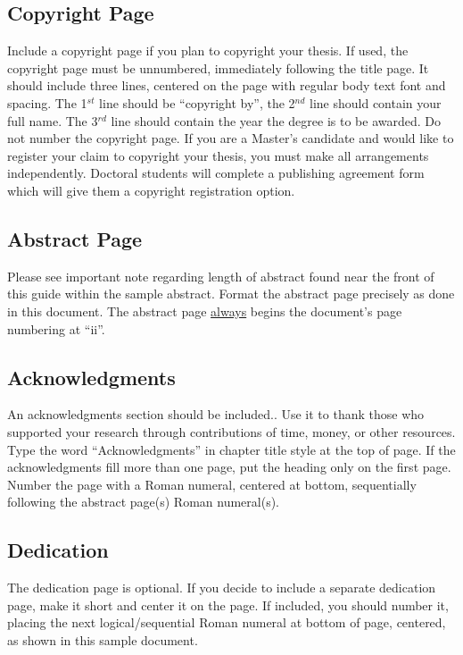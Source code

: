 \subsection{Copyright Page}

Include a copyright page if you plan to copyright your thesis.  If used, the
copyright page must be unnumbered, immediately following the title page.  It
should include three lines, centered on the page with regular body text font
and spacing.  The 1$^{st}$ line should be ``copyright by'', the 2$^{nd}$ line
should contain your full name.  The 3$^{rd}$ line should contain the year the
degree is to be awarded.  Do not number the copyright page.  If you are a
Master's candidate and would like to register your claim to copyright your
thesis, you must make all arrangements independently.  Doctoral students will
complete a publishing agreement form which will give them a copyright
registration option.

\subsection{Abstract Page}

Please see important note regarding length of abstract found near the front of
this guide within the sample abstract.  Format the abstract page precisely as
done in this document.  The abstract page \uline{always} begins the document's
page numbering at ``ii''.

\subsection{Acknowledgments}

An acknowledgments section should be included..  Use it to thank those who
supported your research through contributions of time, money, or other
resources.  Type the word ``Acknowledgments'' in chapter title style at the top
of page.  If the acknowledgments fill more than one page, put the heading only
on the first page.  Number the page with a Roman numeral, centered at bottom,
sequentially following the abstract page(s) Roman numeral(s).

\subsection{Dedication}

The dedication page is optional.  If you decide to include a separate
dedication page,  make it short and center it on the page.  If included, you
should number it, placing the next logical/sequential Roman numeral at bottom
of page, centered, as shown in this sample document.

